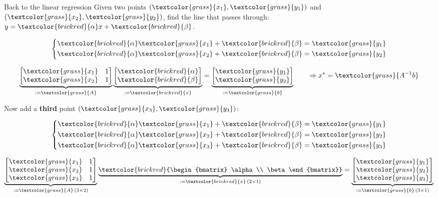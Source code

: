 \documentclass[UKenglish,aspectratio=169]{beamer}
\newcommand\unknown[1]{\textcolor{brickred}{#1}}
\newcommand\known[1]{\textcolor{grass}{#1}}
\begin{document}
\begin{frame}{Back to the linear regression}
Given two points $(\known{x_1}, \known{y_1})$ and $(\known{x_2}, \known{y_2})$, find the line that passes through: $y = \unknown{\alpha} x + \unknown{\beta}$.
\pause
\begin{minipage}{.45\linewidth}
$$
\left\{
\begin{split}
\unknown{\alpha}\known{x_1} + \unknown{\beta} &= \known{y_1}\\
\unknown{\alpha}\known{x_2} + \unknown{\beta} &= \known{y_2}\\
\end{split}
\right.
$$
\end{minipage}
\pause
\begin{minipage}{.45\linewidth}
$$
\underbrace{\begin{bmatrix}\known{x_1}  & 1 \\ \known{x_2} & 1 \end{bmatrix}}_{:=\known{A}}
\underbrace{\begin{bmatrix} \unknown{\alpha} \\ \unknown{\beta} \end{bmatrix}}_{:=\unknown{x}} = \underbrace{\begin{bmatrix} \known{y_1} \\ \known{y_2} \end{bmatrix}}_{:=\known{b}}
\qquad
\Rightarrow x^* = \known{A^{-1}b}
$$
\end{minipage}

\pause
Now add a \textbf{third} point $(\known{x_3}, \known{y_3})$:\\
\begin{minipage}{.45\linewidth}
$$
\left\{
\begin{split}
\unknown{\alpha} \known{x_1} + \unknown{\beta} &= \known{y_1}\\
\unknown{\alpha} \known{x_2} + \unknown{\beta} &= \known{y_2}\\
\unknown{\alpha} \known{x_3} + \unknown{\beta} &= \known{y_3}\\
\end{split}
\right.
$$
\end{minipage}\pause
\begin{minipage}{.45\linewidth}
$$
\underbrace{\begin{bmatrix}\known{x_1}  & 1 \\ \known{x_2} & 1 \\\known{x_3} & 1 \end{bmatrix} }_{:= \known{A}\,(3\times 2)}
\underbrace{\unknown{\begin{bmatrix} \alpha \\ \beta \end{bmatrix}}}_{:=\unknown{x}\,(2\times 1)} = \underbrace{\begin{bmatrix} \known{y_1} \\ \known{y_2} \\ \known{y_3} \end{bmatrix}}_{:=\known{b}\, (3\times 1)}
$$
\end{minipage}


\end{frame}
\end{document}
